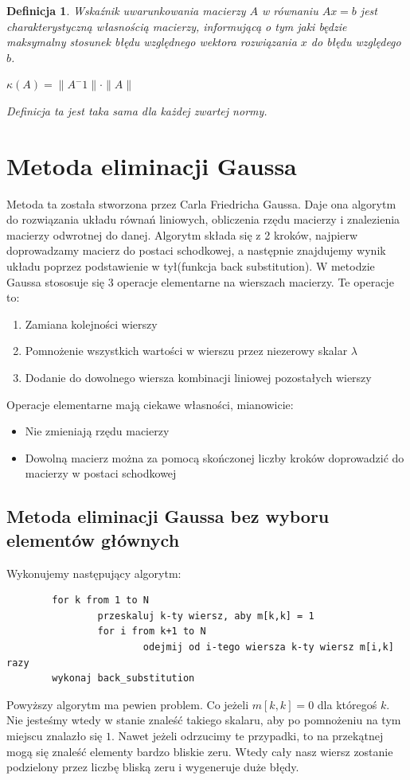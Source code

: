 \documentclass[a4paper,10pt]{article}
\newtheorem{definition}{Definicja}
\begin{document}
\begin{definition}
    Wskaźnik uwarunkowania macierzy $A$ w równaniu $Ax = b$ jest charakterystyczną własnością macierzy, informującą o tym jaki będzie maksymalny stosunek błędu względnego wektora rozwiązania $x$ do błędu względego $b$.
    \begin{center}
        $ \kappa(A) = \|A^-1\| \cdot \|A\|$
    \end{center}
    Definicja ta jest taka sama dla każdej zwartej normy.
\end{definition}
\newpage
\section{Metoda eliminacji Gaussa}
Metoda ta została stworzona przez Carla Friedricha Gaussa. Daje ona algorytm do rozwiązania układu równań liniowych,
obliczenia rzędu macierzy i znalezienia macierzy odwrotnej do danej. Algorytm składa się z 2 kroków, najpierw doprowadzamy
macierz do postaci schodkowej, a następnie znajdujemy wynik układu poprzez podstawienie w tył(funkcja back substitution).
W metodzie Gaussa stososuje się 3 operacje elementarne na wierszach macierzy. Te operacje to:
\begin{enumerate}
	\item Zamiana kolejności wierszy
	\item Pomnożenie wszystkich wartości w wierszu przez niezerowy skalar $\lambda$
	\item Dodanie do dowolnego wiersza kombinacji liniowej pozostałych wierszy
\end{enumerate}
Operacje elementarne mają ciekawe własności, mianowicie:
\begin{itemize}
	\item Nie zmieniają rzędu macierzy
	\item Dowolną macierz można za pomocą skończonej liczby kroków doprowadzić do macierzy w postaci schodkowej
\end{itemize}
\subsection{Metoda eliminacji Gaussa bez wyboru elementów głównych}
Wykonujemy następujący algorytm:
\begin{verbatim}
        for k from 1 to N
                przeskaluj k-ty wiersz, aby m[k,k] = 1
                for i from k+1 to N
                        odejmij od i-tego wiersza k-ty wiersz m[i,k] razy
        wykonaj back_substitution
\end{verbatim}
Powyższy algorytm ma pewien problem. Co jeżeli $m[k,k] = 0$ dla któregoś $k$. Nie jesteśmy wtedy w stanie
znaleść takiego skalaru, aby po pomnożeniu na tym miejscu znalazło się $1$. Nawet jeżeli odrzucimy te przypadki,
to na przekątnej mogą się znaleść elementy bardzo bliskie zeru. Wtedy cały nasz wiersz zostanie podzielony przez
liczbę bliską zeru i wygeneruje duże błędy.
\end{document}
